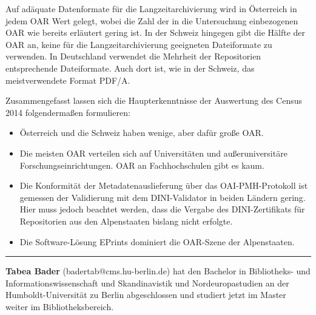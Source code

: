 \documentclass[a4paper,
fontsize=11pt,
oneside,
numbers=noperiodatend,
parskip=half-,
bibliography=totoc,
final
]{scrartcl}
\begin{document}
Auf adäquate Datenformate für die Langzeitarchivierung wird in
Österreich in jedem OAR Wert gelegt, wobei die Zahl der in die
Untersuchung einbezogenen OAR wie bereits erläutert gering ist. In der
Schweiz hingegen gibt die Hälfte der OAR an, keine für die
Langzeitarchivierung geeigneten Dateiformate zu verwenden. In
Deutschland verwendet die Mehrheit der Repositorien entsprechende
Dateiformate. Auch dort ist, wie in der Schweiz, das meistverwendete
Format PDF/A.

Zusammengefasst lassen sich die Haupterkenntnisse der Auswertung des
Census 2014 folgendermaßen formulieren:

\begin{itemize}
\item
  Österreich und die Schweiz haben wenige, aber dafür große OAR.
\item
  Die meisten OAR verteilen sich auf Universitäten und außeruniversitäre
  Forschungseinrichtungen. OAR an Fachhochschulen gibt es kaum.
\item
  Die Konformität der Metadatenauslieferung über das OAI-PMH-Protokoll
  ist gemessen der Validierung mit dem DINI-Validator in beiden Ländern
  gering. Hier muss jedoch beachtet werden, dass die Vergabe des
  DINI-Zertifikats für Repositorien aus den Alpenstaaten bislang nicht
  erfolgte.
\item
  Die Software-Lösung EPrints dominiert die OAR-Szene der Alpenstaaten.
\end{itemize}

\begin{center}\rule{0.5\linewidth}{\linethickness}\end{center}

\textbf{Tabea Bader} (badertab@cms.hu-berlin.de) hat den Bachelor in
Bibliotheks- und Informationswissenschaft und Skandinavistik und
Nordeuropastudien an der Humboldt-Universität zu Berlin abgeschlossen
und studiert jetzt im Master weiter im Bibliotheksbereich.
\end{document}
